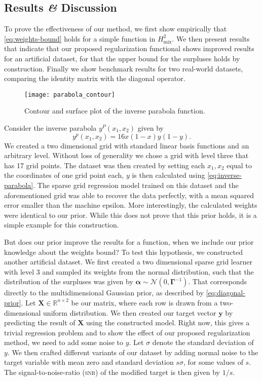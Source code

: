 \subsection{Results \textit{\&} Discussion}
To prove the effectiveness of our method, we first show empirically that \cref{eq:weights-bound} holds for a simple function in \(H^2_{\text{mix}}\).
We then present results that indicate that our proposed regularization functional shows improved results for an artificial dataset, for that the upper bound for the surpluses holds by construction.
Finally we show benchmark results for two real-world datasets, comparing the identity matrix with the diagonal operator.

\begin{figure}[ht]
  \centering
    \texttt{[image: parabola\_contour]}
  \caption{Contour and surface plot of the inverse parabola function.}
\end{figure}
Consider the inverse parabola \(y^P(x_1, x_2)\) given by
\begin{equation}\label{eq:inverse-parabola}
  y^p(x_1, x_2) = 16x(1-x)y(1-y).
\end{equation}
We created a two dimensional grid with standard linear basis functions and an arbitrary level.
Without loss of generality we chose a grid with level three that has 17 grid
points.
The dataset was then created by setting each \(x_1, x_2\) equal to the coordinates of one grid point each, \(y\) is then calculated using \cref{eq:inverse-parabola}.
The sparse grid regression model trained on this dataset and the aforementioned
grid was able to recover the data perfectly, with a mean squared error smaller than the machine epsilon. More interestingly, the calculated weights were identical to our prior.
While this does not prove that this prior holds, it is a simple example for this construction.

But does our prior improve the results for a function, when we include our prior
knowledge about the weights bound?
To test this hypothesis, we constructed another artificial dataset.
We first created a two dimensional sparse grid learner with level 3 and sampled its weights from the normal distribution, such that the distribution of the surpluses was given by \(\bm{\alpha} \sim \mathcal{N}(0, \bm{\Gamma}^{-1})\).
That corresponds directly to the multidimensional Gaussian prior, as described by \cref{eq:diagonal-prior}.
Let \(\bm{X} \in \mathbb{R}^{n \times 2}\) be our matrix, where each row is drawn from a two-dimensional uniform distribution.
We then created our target vector \(\bm{y}\) by predicting the result of
\(\bm{X}\) using the constructed model.
Right now, this gives a trivial regression problem and to show the effect of our
proposed regularization method, we need to add some noise to \(y\).
Let \(\sigma\) denote the standard deviation of \(y\).
We then crafted different variants of our dataset by adding normal noise to the
target variable with mean zero and standard deviation \(s \sigma\), for some
values of \(s\).
The signal-to-noise-ratio (\textsc{snr}) of the modified target is then given by \(1/s\).

